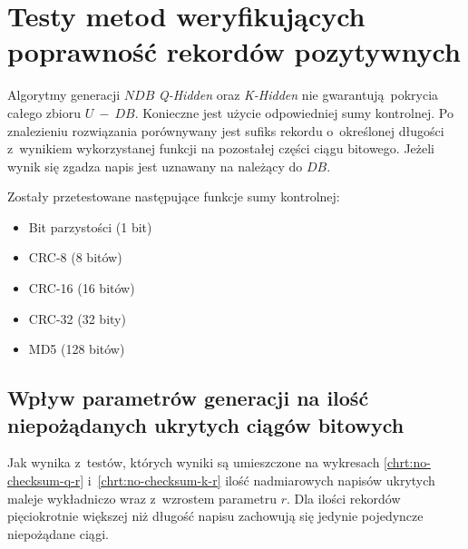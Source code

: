 \section{Testy metod weryfikujących poprawność rekordów pozytywnych}

\label{sec:red-str-test}
Algorytmy generacji $NDB$ \textit{Q-Hidden} oraz \textit{K-Hidden} nie gwarantują pokrycia całego zbioru $U~-~DB$.
Konieczne jest użycie odpowiedniej sumy kontrolnej. Po znalezieniu rozwiązania porównywany jest sufiks rekordu o~określonej
długości z~wynikiem wykorzystanej funkcji na pozostałej części ciągu bitowego. Jeżeli wynik się zgadza napis jest uznawany na należący
do $DB$.

Zostały przetestowane następujące funkcje sumy kontrolnej:

\begin{itemize}
    \item Bit parzystości (1 bit)
    \item CRC-8 (8 bitów)
    \item CRC-16 (16 bitów)
    \item CRC-32 (32 bity)
    \item MD5 (128 bitów)
\end{itemize}


\subsection{Wpływ parametrów generacji na ilość niepożądanych ukrytych ciągów bitowych}

Jak wynika z~testów, których wyniki są umieszczone na wykresach \ref{chrt:no-checksum-q-r} i~\ref{chrt:no-checksum-k-r}
ilość nadmiarowych napisów ukrytych maleje wykładniczo wraz z~wzrostem parametru $r$. Dla ilości rekordów pięciokrotnie większej niż długość napisu
zachowują się jedynie pojedyncze niepożądane ciągi. 

